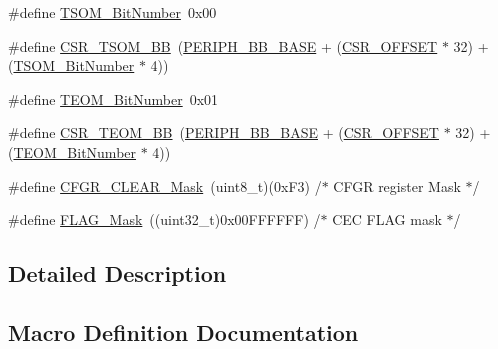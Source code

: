 \begin{DoxyCompactItemize}
\item 
\#define \hyperlink{group___c_e_c___private___defines_ga1a470abab836eba7b451950938708946}{T\+S\+O\+M\+\_\+\+Bit\+Number}~0x00
\item 
\#define \hyperlink{group___c_e_c___private___defines_ga4971cc50b0ead4a493e2a9c03966c826}{C\+S\+R\+\_\+\+T\+S\+O\+M\+\_\+\+BB}~(\hyperlink{group___peripheral__memory__map_gaed7efc100877000845c236ccdc9e144a}{P\+E\+R\+I\+P\+H\+\_\+\+B\+B\+\_\+\+B\+A\+SE} + (\hyperlink{group___r_c_c___private___defines_ga984cbe73312b6d3d355c5053763d499a}{C\+S\+R\+\_\+\+O\+F\+F\+S\+ET} $\ast$ 32) + (\hyperlink{group___c_e_c___private___defines_ga1a470abab836eba7b451950938708946}{T\+S\+O\+M\+\_\+\+Bit\+Number} $\ast$ 4))
\item 
\#define \hyperlink{group___c_e_c___private___defines_gac86378eff7728e5cfca5480ab2dbef0b}{T\+E\+O\+M\+\_\+\+Bit\+Number}~0x01
\item 
\#define \hyperlink{group___c_e_c___private___defines_ga9ac493d98ce1f6d82b778ace0f2bc7bb}{C\+S\+R\+\_\+\+T\+E\+O\+M\+\_\+\+BB}~(\hyperlink{group___peripheral__memory__map_gaed7efc100877000845c236ccdc9e144a}{P\+E\+R\+I\+P\+H\+\_\+\+B\+B\+\_\+\+B\+A\+SE} + (\hyperlink{group___r_c_c___private___defines_ga984cbe73312b6d3d355c5053763d499a}{C\+S\+R\+\_\+\+O\+F\+F\+S\+ET} $\ast$ 32) + (\hyperlink{group___c_e_c___private___defines_gac86378eff7728e5cfca5480ab2dbef0b}{T\+E\+O\+M\+\_\+\+Bit\+Number} $\ast$ 4))
\item 
\#define \hyperlink{group___c_e_c___private___defines_gaaedf9b8df17534f5eaf75ec1ca3fbd7a}{C\+F\+G\+R\+\_\+\+C\+L\+E\+A\+R\+\_\+\+Mask}~(uint8\+\_\+t)(0x\+F3)        /$\ast$ C\+F\+G\+R register Mask $\ast$/
\item 
\#define \hyperlink{group___c_e_c___private___defines_ga2be62bf481cd44de9ab604efe5595ff6}{F\+L\+A\+G\+\_\+\+Mask}~((uint32\+\_\+t)0x00\+F\+F\+F\+F\+F\+F) /$\ast$ C\+E\+C F\+L\+A\+G mask $\ast$/
\end{DoxyCompactItemize}


\subsection{Detailed Description}


\subsection{Macro Definition Documentation}
\mbox{\label{group___c_e_c___private___defines_ga675324bd8967b75f32554f50210821af}} 
